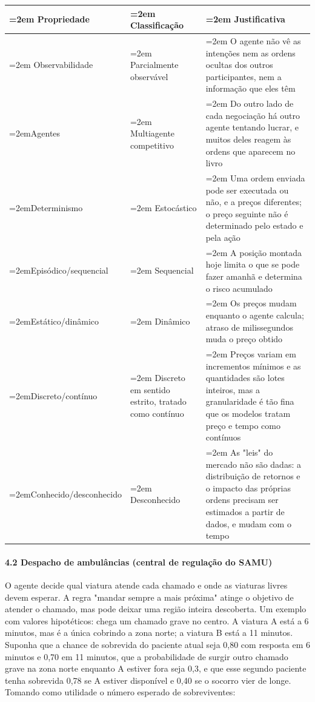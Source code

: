 \documentclass[12pt, a4paper]{article}
\begin{document}
\begingroup
\setlength{\tabcolsep}{4.0pt}
\begin{longtable}{@{}>{\raggedright\hyphenpenalty=30\tolerance=999\emergencystretch=2em\arraybackslash}p{4.50cm}>{\raggedright\hyphenpenalty=30\tolerance=999\emergencystretch=2em\arraybackslash}p{2.93cm}>{\raggedright\hyphenpenalty=30\tolerance=999\emergencystretch=2em\arraybackslash}p{7.29cm}@{}}
\toprule\noalign{}
Propriedade & Clas\-si\-fi\-ca\-ção & Justificativa \\
\midrule\noalign{}
\endhead
\bottomrule\noalign{}
\endlastfoot
Observabilidade & Parcialmente ob\-ser\-vá\-vel & O agente não vê as intenções nem as ordens ocultas dos outros participantes, nem a in\-for\-ma\-ção que eles têm \\
Agentes & Multiagente competitivo & Do outro lado de cada ne\-go\-ci\-a\-ção há outro agente tentando lucrar, e muitos deles reagem às ordens que aparecem no livro \\
Determinismo & Es\-to\-cás\-tico & Uma ordem enviada pode ser executada ou não, e a preços diferentes; o preço seguinte não é determinado pelo estado e pela ação \\
Episódico\slash sequencial & Sequencial & A posição montada hoje limita o que se pode fazer amanhã e determina o risco acumulado \\
Estático\slash dinâmico & Dinâmico & Os preços mudam enquanto o agente calcula; atraso de milissegundos muda o preço obtido \\
Discreto\slash contínuo & Discreto em sentido estrito, tratado como contínuo & Preços variam em incrementos mínimos e as quantidades são lotes inteiros, mas a granularidade é tão fina que os modelos tratam preço e tempo como contínuos \\
Conhecido\slash desconhecido & Desconhecido & As "leis" do mercado não são dadas: a dis\-tri\-bui\-ção de retornos e o impacto das próprias ordens precisam ser estimados a partir de dados, e mudam com o tempo \\
\end{longtable}
\endgroup

\paragraph{4.2 Despacho de ambulâncias (central de regulação do SAMU)}\label{42-despacho-de-ambuluxe2ncias-central-de-regulauxe7uxe3o-do-samu}

O agente decide qual viatura atende cada chamado e onde as viaturas livres devem esperar. A regra "mandar sempre a mais próxima" atinge o objetivo de atender o chamado, mas pode deixar uma região inteira descoberta. Um exemplo com valores hipotéticos: chega um chamado grave no centro. A viatura A está a 6 minutos, mas é a única cobrindo a zona norte; a viatura B está a 11 minutos. Suponha que a chance de sobrevida do paciente atual seja 0,80 com resposta em 6 minutos e 0,70 em 11 minutos, que a probabilidade de surgir outro chamado grave na zona norte enquanto A estiver fora seja 0,3, e que esse segundo paciente tenha sobrevida 0,78 se A estiver disponível e 0,40 se o socorro vier de longe. Tomando como utilidade o número esperado de sobreviventes:
\end{document}

